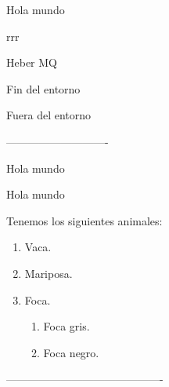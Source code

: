 \documentclass{book}
\begin{document}
Hola mundo


\newcommand\f[2][\frac{a}{b}]{$(#1 + #2)$}


\newenvironment{textocolor}[2][red]{
	\color{#1}
	#2
	\bfseries
}{
	Fin del entorno
}

\begin{textocolor}[magenta]{rrr}

Heber MQ

\end{textocolor}

Fuera del entorno



%
%
%
%
%
%
%
%
%

----------------------------



\setcounter{micontador}{100}

\themicontador


\addtocounter{micontador}{-10}


\themicontador


\setcounter{page}{0}


\newpage

Hola mundo


\newpage

Hola mundo

\makeatletter
\renewcommand{\theenumi}{%
	\bfseries
	\color{magenta}
	\@arabic\c@enumi
}
\makeatother

Tenemos los siguientes animales:
\begin{enumerate}
	\item Vaca.
	\item Mariposa.
	\item Foca.
	\begin{enumerate}
		\item Foca gris.
		\item Foca negro.
	\end{enumerate}
\end{enumerate}


-------------------------------------------
\newlength{\milong}
\setlength{\milong}{100pt}
\addtolength{\milong}{-10pt}

\the\milong
\end{document}

